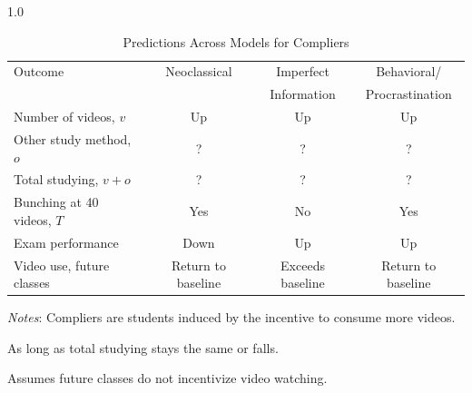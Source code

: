 \clearpage
\begin{spacing}{1.0}
	\begin{table}
		\centering
		\caption{Predictions Across Models for Compliers}
		\label{tab:modelpredictions}
		\begin{threeparttable}
			\begin{tabular}{lccc}
				\toprule
				Outcome                     & Neoclassical       & Imperfect        & Behavioral/        \\
				                            &                    & Information      & Procrastination    \\
				\midrule
				Number of videos, $v$       & Up                 & Up               & Up                 \\
				Other study method, $o$     & ?                  & ?                & ?                  \\
				Total studying, $v+o$       & ?                  & ?                & ?                  \\
				Bunching at 40 videos, $T$  & Yes                & No               & Yes                \\
				Exam performance            & Down\tnote{a}      & Up               & Up                 \\
				Video use, future classes\tnote{b} & Return to baseline & Exceeds baseline & Return to baseline \\
				\bottomrule
			\end{tabular}
			\begin{tablenotes}[flushleft]\footnotesize
				\item \textit{Notes}: Compliers are students induced by the incentive to consume more videos.
				\item[a] As long as total studying stays the same or falls.
				\item[b] Assumes future classes do not incentivize video watching.
			\end{tablenotes}
		\end{threeparttable}
	\end{table}
\end{spacing}

\setcounter{table}{0}
\renewcommand{\thetable}{A\arabic{table}}

\clearpage


\clearpage


\clearpage


